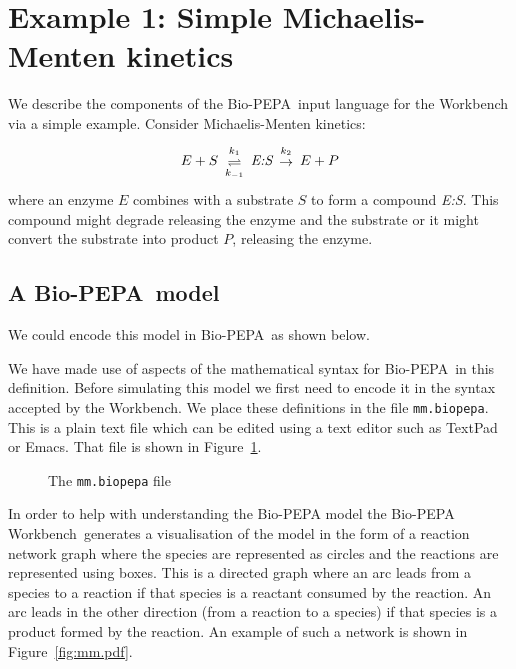 \documentclass[11pt,a4paper]{article}
\newcommand{\BioPEPA}{Bio-PEPA}
\newcommand{\BPWB}{{\BioPEPA} Workbench}
\begin{document}
\section{Example 1: Simple Michaelis-Menten kinetics}
We describe the components of the \BioPEPA\ input language for the
Workbench via a simple example.  Consider Michaelis-Menten kinetics:
\newcommand{\forcescriptsize}[1]{\hbox{\scriptsize\ensuremath{#1}}}%
\newcommand{\stackthree}[3]{\begin{array}{c}
    \forcescriptsize{#1}\\[-3pt] #2\\[-5pt] \forcescriptsize{#3}
    \end{array}}
\newcommand{\stacktwo}[2]{\stackthree{#1}{#2}{\phantom{#1}}}
\begin{displaymath}
E + S \stackthree{k_1}{\rightleftharpoons}{k_{-1}} \textit{E:S}
      \stacktwo{k_2}{\rightarrow} E + P
\end{displaymath}
where an enzyme $E$ combines with a substrate $S$ to form a compound
\textit{E:S}.  This compound might degrade releasing the enzyme and
the substrate or it might convert the substrate into product $P$,
releasing the enzyme.

\subsection{A \BioPEPA\ model}
We could encode this model in \BioPEPA\ as shown below.
 
We have made use of aspects of the mathematical syntax for \BioPEPA\
in this definition.  Before simulating this model we first need to
encode it in the syntax accepted by the Workbench.  We place
these definitions in the file {\tt mm.biopepa}. 
This is a plain text file which can be edited using a text editor such
as TextPad or Emacs.  That file is shown in Figure~\ref{fig:mm.biopepa}.

\begin{figure}[htbp]

\caption{\label{fig:mm.biopepa} The \texttt{mm.biopepa} file}
\end{figure}

In order to help with understanding the Bio-PEPA model the \BPWB\
generates a visualisation of the model in the form of a reaction
network graph where the species are represented as circles and the
reactions are represented using boxes.  This is a directed graph where
an arc leads from a species to a reaction if that species is a
reactant consumed by the reaction.  An arc leads in the other
direction (from a reaction to a species) if that species is a product
formed by the reaction.  An example of such a network is shown in
Figure~\ref{fig:mm.pdf}. 
\end{document}
